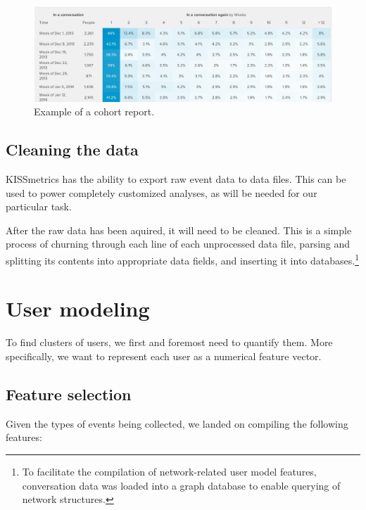 \begin{figure}[h]
  \centering
    \includegraphics[width=\textwidth]{Figures/screenshots/km/cohort-example}
    \caption{Example of a cohort report.}
    \label{fig:cohort-report}
\end{figure}

\subsection{Cleaning the data}
\label{approach:sec:cleaning_data}

KISSmetrics has the ability to export raw event data to data files. This can be used to power completely customized analyses, as will be needed for our particular task.

After the raw data has been aquired, it will need to be cleaned. This is a simple process of churning through each line of each unprocessed data file, parsing and splitting its contents into appropriate data fields, and inserting it into databases.\footnote{To facilitate the compilation of network-related user model features, conversation data was loaded into a graph database to enable querying of network structures.}


\section{User modeling} %
\label{approach:sec:user_modeling}

To find clusters of users, we first and foremost need to quantify them. More specifically, we want to represent each user as a numerical feature vector.

\subsection{Feature selection}
\label{approach:sec:feature_selection}

Given the types of events being collected, we landed on compiling the following features:

